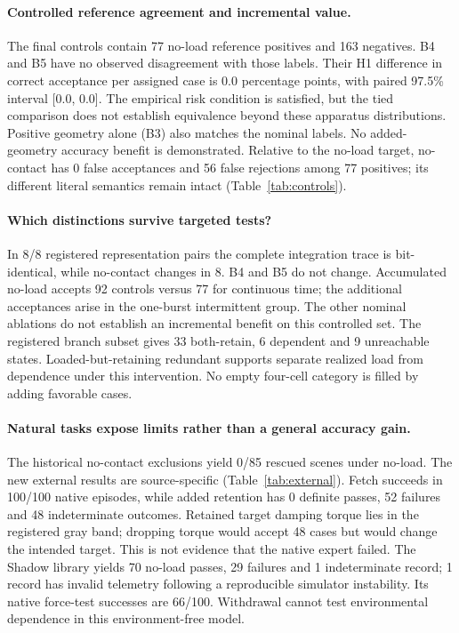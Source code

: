 \paragraph{Controlled reference agreement and incremental value.}
The final controls contain 77 no-load reference positives and 163
negatives. B4 and B5 have no observed disagreement with those labels. Their
H1 difference in correct acceptance per assigned case is 0.0
percentage points, with paired 97.5\% interval
[0.0, 0.0].
The empirical risk condition is satisfied, but the tied comparison does not
establish equivalence beyond these apparatus distributions. Positive geometry
alone (B3) also matches the nominal labels. No added-geometry accuracy benefit
is demonstrated. Relative to the no-load target, no-contact has 0 false
acceptances and 56 false rejections among 77 positives; its different
literal semantics remain intact (Table~\ref{tab:controls}).

\paragraph{Which distinctions survive targeted tests?}
In 8/8 registered representation pairs the complete
integration trace is bit-identical, while no-contact changes in 8.
B4 and B5 do not change. Accumulated no-load accepts
92 controls versus 77
for continuous time; the additional acceptances arise in the one-burst
intermittent group. The other nominal ablations do not establish an incremental
benefit on this controlled set. The registered branch subset gives
33 both-retain, 6 dependent and
9 unreachable states. Loaded-but-retaining redundant
supports separate realized load from dependence under this intervention.
No empty four-cell category is filled by adding favorable cases.

\paragraph{Natural tasks expose limits rather than a general accuracy gain.}
The historical no-contact exclusions yield 0/85 rescued scenes under no-load.
The new external results are source-specific (Table~\ref{tab:external}).
Fetch succeeds in 100/100 native episodes, while added retention has
0 definite passes, 52 failures and
48 indeterminate outcomes. Retained target damping torque
lies in the registered gray band; dropping torque would accept 48 cases but
would change the intended target. This is not evidence that the native expert
failed. The Shadow library yields 70 no-load passes,
29 failures and 1 indeterminate record;
1 record has invalid telemetry following a reproducible simulator
instability. Its native force-test successes are 66/100.
Withdrawal cannot test environmental dependence in this environment-free model.

